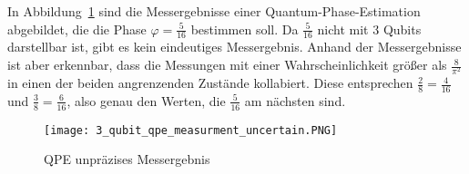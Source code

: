 In Abbildung~\ref{fig:3_qubit_qpe_measurment_uncertain} sind die Messergebnisse einer Quantum-Phase-Estimation abgebildet, 
die die Phase \(\varphi = \frac{5}{16}\) bestimmen soll.
Da \(\frac{5}{16}\) nicht mit 3 Qubits darstellbar ist, 
gibt es kein eindeutiges Messergebnis.
Anhand der Messergebnisse ist aber erkennbar, 
dass die Messungen mit einer Wahrscheinlichkeit größer als \(\frac{8}{\pi^2}\) in
einen der beiden angrenzenden Zustände kollabiert.
Diese entsprechen \({\frac{2}{8} = \frac{4}{16}}\) und \({\frac{3}{8} = \frac{6}{16}}\), 
also genau den Werten, die \(\frac{5}{16}\) am nächsten sind.

\begin{figure}[H]
  \centering
  \texttt{[image: 3\_qubit\_qpe\_measurment\_uncertain.PNG]}
  \caption{QPE unpräzises Messergebnis}
  \label{fig:3_qubit_qpe_measurment_uncertain}
\end{figure}












 






 











